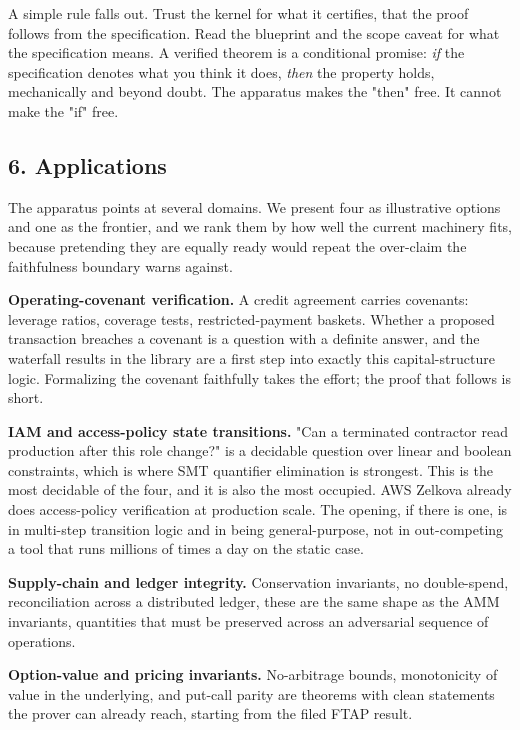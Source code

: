 \documentclass[
  11pt,
]{article}
\renewcommand{\_}{\origunderscore\allowbreak}
\begin{document}
A simple rule falls out. Trust the kernel for what it certifies, that
the proof follows from the specification. Read the blueprint and the
scope caveat for what the specification means. A verified theorem is a
conditional promise: \emph{if} the specification denotes what you think
it does, \emph{then} the property holds, mechanically and beyond doubt.
The apparatus makes the "then" free. It cannot make the "if" free.

\subsection{6. Applications}\label{6-applications}

The apparatus points at several domains. We present four as illustrative
options and one as the frontier, and we rank them by how well the
current machinery fits, because pretending they are equally ready would
repeat the over-claim the faithfulness boundary warns against.

\textbf{Operating-covenant verification.} A credit agreement carries
covenants: leverage ratios, coverage tests, restricted-payment baskets.
Whether a proposed transaction breaches a covenant is a question with a
definite answer, and the waterfall results in the library are a first
step into exactly this capital-structure logic. Formalizing the covenant
faithfully takes the effort; the proof that follows is short.

\textbf{IAM and access-policy state transitions.} "Can a terminated
contractor read production after this role change?" is a decidable
question over linear and boolean constraints, which is where SMT
quantifier elimination is strongest. This is the most decidable of the
four, and it is also the most occupied. AWS Zelkova already does
access-policy verification at production scale. The opening, if there is
one, is in multi-step transition logic and in being general-purpose, not
in out-competing a tool that runs millions of times a day on the static
case.

\textbf{Supply-chain and ledger integrity.} Conservation invariants, no
double-spend, reconciliation across a distributed ledger, these are the
same shape as the AMM invariants, quantities that must be preserved
across an adversarial sequence of operations.

\textbf{Option-value and pricing invariants.} No-arbitrage bounds,
monotonicity of value in the underlying, and put-call parity are
theorems with clean statements the prover can already reach, starting
from the filed FTAP result.
\end{document}
